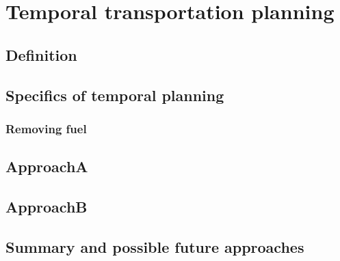 \chapter{Temporal transportation planning}

\section{Definition}

\section{Specifics of temporal planning}

\subsection{Removing fuel}

\section{ApproachA}

\section{ApproachB}

\section{Summary and possible future approaches}



